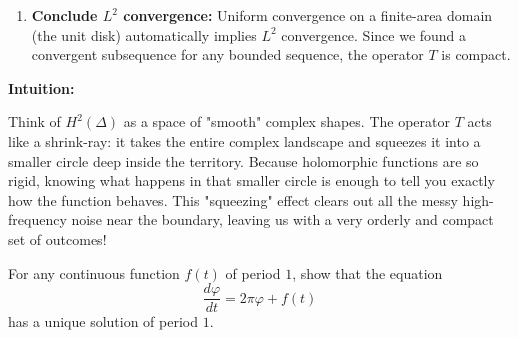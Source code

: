 \begin{solution}
\begin{enumerate}
    \item \textbf{Conclude $L^2$ convergence:}
        Uniform convergence on a finite-area domain (the unit disk) automatically implies $L^2$ convergence. Since we found a convergent subsequence for any bounded sequence, the operator $T$ is compact.
\end{enumerate}


\textbf{Intuition:}

Think of $H^2(\Delta)$ as a space of "smooth" complex shapes. The operator $T$ acts like a shrink-ray: it takes the entire complex landscape and squeezes it into a smaller circle deep inside the territory. Because holomorphic functions are so rigid, knowing what happens in that smaller circle is enough to tell you exactly how the function behaves. This "squeezing" effect clears out all the messy high-frequency noise near the boundary, leaving us with a very orderly and compact set of outcomes!
\end{solution}

\vspace{2em}

\begin{exercise}
\label{analysis:2011:8}
For any continuous function $f(t)$ of period $1$, show that the equation
\[
\frac{d\varphi}{dt} = 2\pi\varphi + f(t)
\]
has a unique solution of period $1$.
\end{exercise}

